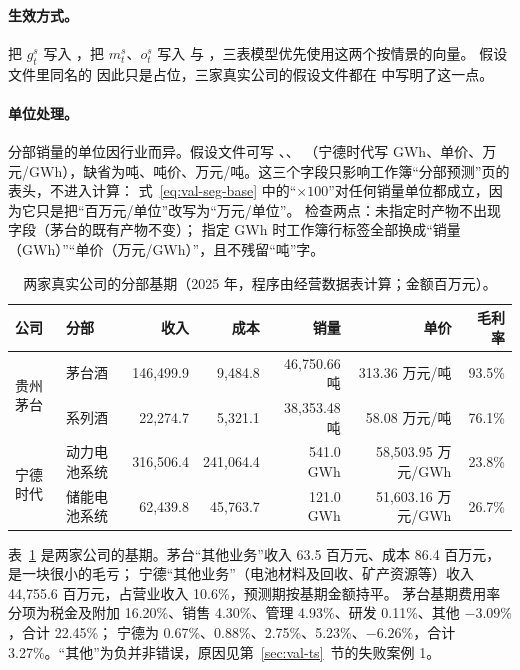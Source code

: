\paragraph{生效方式。}  把 $g^s_t$ 写入 ，把 $m^s_t$、$o^s_t$ 写入
 与 ，三表模型优先使用这两个按情景的向量。
假设文件里同名的  因此只是占位，三家真实公司的假设文件都在  中写明了这一点。

\paragraph{单位处理。} 分部销量的单位因行业而异。假设文件可写 、、
（宁德时代写 GWh、单价、万元/GWh），缺省为吨、吨价、万元/吨。这三个字段只影响工作簿“分部预测”页的表头，不进入计算：
式~\eqref{eq:val-seg-base} 中的“$\times 100$”对任何销量单位都成立，因为它只是把“百万元/单位”改写为“万元/单位”。
 检查两点：未指定时产物不出现  字段（茅台的既有产物不变）；
指定 GWh 时工作簿行标签全部换成“销量（GWh）”“单价（万元/GWh）”，且不残留“吨”字。

\begin{table}[t]
\centering
\caption{两家真实公司的分部基期（2025 年，程序由经营数据表计算；金额百万元）。}
\label{tab:val-seg-real}
\small
\begin{tabular}{@{}llrrrrr@{}}
\toprule
公司 & 分部 & 收入 & 成本 & 销量 & 单价 & 毛利率 \\
\midrule
\multirow{2}{*}{贵州茅台} & 茅台酒 & 146,499.9 & 9,484.8 & 46,750.66 吨 & 313.36 万元/吨 & 93.5\% \\
 & 系列酒 & 22,274.7 & 5,321.1 & 38,353.48 吨 & 58.08 万元/吨 & 76.1\% \\
\multirow{2}{*}{宁德时代} & 动力电池系统 & 316,506.4 & 241,064.4 & 541.0 GWh & 58,503.95 万元/GWh & 23.8\% \\
 & 储能电池系统 & 62,439.8 & 45,763.7 & 121.0 GWh & 51,603.16 万元/GWh & 26.7\% \\
\bottomrule
\end{tabular}
\end{table}

表~\ref{tab:val-seg-real} 是两家公司的基期。茅台“其他业务”收入 63.5 百万元、成本 86.4 百万元，是一块很小的毛亏；
宁德“其他业务”（电池材料及回收、矿产资源等）收入 44,755.6 百万元，占营业收入 10.6\%，预测期按基期金额持平。
茅台基期费用率分项为税金及附加 16.20\%、销售 4.30\%、管理 4.93\%、研发 0.11\%、其他 $-3.09\%$，合计 22.45\%；
宁德为 0.67\%、0.88\%、2.75\%、5.23\%、$-6.26\%$，合计 3.27\%。“其他”为负并非错误，原因见第~\ref{sec:val-ts}~节的失败案例 1。

